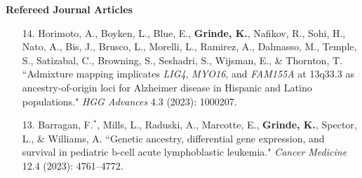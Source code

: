 \documentclass[margin]{res}
\begin{document}
\begin{resume}
\textbf{Refereed Journal Articles}

\begin{itemize}
\item[14.] Horimoto, A., Boyken, L., Blue, E., \textbf{Grinde, K.}, Nafikov, R., Sohi, H., Nato, A., Bis, J., Brusco, L., Morelli, L., Ramirez, A., Dalmasso, M.,  Temple, S., Satizabal, C., Browning, S., Seshadri, S., Wijsman, E., \& Thornton, T. ``Admixture mapping implicates \textit{LIG4}, \textit{MYO16}, and \textit{FAM155A} at 13q33.3 as ancestry-of-origin loci for Alzheimer disease in Hispanic and Latino populations." \textit{HGG Advances} 4.3 (2023): 1000207.

\item[13.] Barragan, F.$^*$, Mills, L., Raduski, A., Marcotte, E., \textbf{Grinde, K.}, Spector, L., \& Williams, A. ``Genetic ancestry, differential gene expression, and survival in pediatric b-cell acute lymphoblastic leukemia." \textit{Cancer Medicine} 12.4 (2023): 4761--4772.



\end{itemize}
\end{resume}
\end{document}
